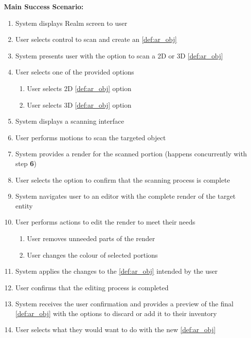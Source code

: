 \documentclass{article}
\begin{document}
\begin{enumerate}[label=\textbf{UC\arabic*}]
          \textbf{Main Success Scenario:}
          \begin{enumerate}[label=\textbf{\arabic*.}]
              \item System displays Realm screen to user
              \item User selects control to scan and create an \ref{def:ar_obj}
              \item System presents user with the option to scan a 2D or 3D \ref{def:ar_obj}
              \item User selects one of the provided options
                    \begin{enumerate}[label=(\alph*)]
                        \item User selects 2D \ref{def:ar_obj} option
                        \item User selects 3D \ref{def:ar_obj} option
                    \end{enumerate}
              \item System displays a scanning interface
              \item User performs motions to scan the targeted object
              \item System provides a render for the scanned portion (happens concurrently with step \textbf{6})
              \item User selects the option to confirm that the scanning process is complete
              \item System navigates user to an editor with the complete render of the target entity
              \item User performs actions to edit the render to meet their needs
                    \begin{enumerate}[label=(\alph*)]
                        \item User removes unneeded parts of the render
                        \item User changes the colour of selected portions
                    \end{enumerate}
              \item System applies the changes to the \ref{def:ar_obj} intended by the user
              \item User confirms that the editing process is completed
              \item System receives the user confirmation and provides a preview of the final \ref{def:ar_obj} with the options to discard or add it to their inventory
              \item User selects what they would want to do with the new \ref{def:ar_obj}

\end{enumerate}
\end{enumerate}
\end{document}
